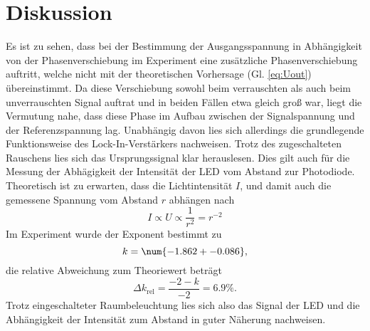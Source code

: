 \section{Diskussion}
Es ist zu sehen, dass bei der Bestimmung der Ausgangsspannung in Abhängigkeit von der Phasenverschiebung im Experiment eine zusätzliche Phasenverschiebung auftritt, welche nicht mit der theoretischen Vorhersage (Gl. \eqref{eq:Uout}) übereinstimmt. Da diese Verschiebung sowohl beim verrauschten als auch beim unverrauschten Signal auftrat und in beiden Fällen etwa gleich groß war, liegt die Vermutung nahe, dass diese Phase im Aufbau zwischen der Signalspannung und der Referenzspannung lag. Unabhängig davon lies sich allerdings die grundlegende Funktionsweise des Lock-In-Verstärkers nachweisen. Trotz des zugeschalteten Rauschens lies sich das Ursprungssignal klar herauslesen. Dies gilt auch für die Messung der Abhägigkeit der Intensität der LED vom Abstand zur Photodiode. Theoretisch ist zu erwarten, dass die Lichtintensität $I$, und damit auch die gemessene Spannung vom Abstand $r$ abhängen nach
\begin{equation*}
    I \propto U \propto \frac{1}{r^2} = r^{-2}
\end{equation*}
Im Experiment wurde der Exponent bestimmt zu
\begin{equation*}
    k = \num{-1.862 +- 0.086},
\end{equation*}
die relative Abweichung zum Theoriewert beträgt
\begin{equation*}
    \Delta k_\text{rel} = \frac{-2 - k}{-2} = 6.9 \% .
\end{equation*}
Trotz eingeschalteter Raumbeleuchtung lies sich also das Signal der LED und die Abhängigkeit der Intensität zum Abstand in guter Näherung nachweisen.
